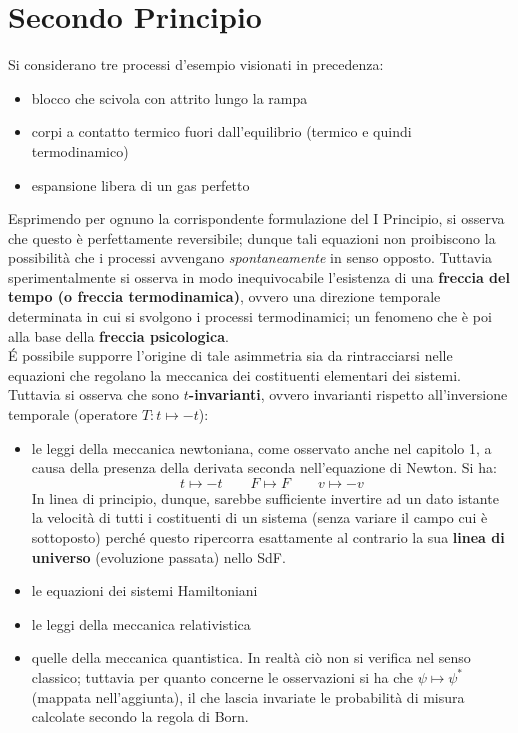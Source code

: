 \documentclass[10pt, oneside]{book}
\begin{document}
\chapter{Secondo Principio}
Si considerano tre processi d'esempio visionati in precedenza: 
\begin{itemize}
\item blocco che scivola con attrito lungo la rampa
\item corpi a contatto termico fuori dall'equilibrio (termico e quindi termodinamico)
\item espansione libera di un gas perfetto
\end{itemize}
Esprimendo per ognuno la corrispondente formulazione del I Principio, si osserva che questo è perfettamente reversibile; dunque tali equazioni non proibiscono la possibilità che i processi avvengano \textit{spontaneamente} in senso opposto. Tuttavia sperimentalmente si osserva in modo inequivocabile l'esistenza di una \textbf{freccia del tempo (o freccia termodinamica)}, ovvero una direzione temporale determinata in cui si svolgono i processi termodinamici; un fenomeno che è poi alla base della \textbf{freccia psicologica}.\\
\'E possibile supporre l'origine di tale asimmetria sia da rintracciarsi nelle equazioni che regolano la meccanica dei costituenti elementari dei sistemi. Tuttavia si osserva che sono \textbf{$t$-invarianti}, ovvero invarianti rispetto all'inversione temporale (operatore $T: t \mapsto -t$):
\begin{itemize}
\item le leggi della meccanica newtoniana, come osservato anche nel capitolo 1, a causa della presenza della derivata seconda nell'equazione di Newton. Si ha:
\[t \mapsto -t \quad \quad F \mapsto F \quad \quad v \mapsto -v\]
In linea di principio, dunque, sarebbe sufficiente invertire ad un dato istante la velocità di tutti i costituenti di un sistema (senza variare il campo cui è sottoposto) perché questo ripercorra esattamente al contrario la sua \textbf{linea di universo} (evoluzione passata) nello SdF.
\item le equazioni dei sistemi Hamiltoniani
\item le leggi della meccanica relativistica
\item quelle della meccanica quantistica. In realtà ciò non si verifica nel senso classico; tuttavia per quanto concerne le osservazioni si ha che $\psi \mapsto \psi^\ast$ (mappata nell'aggiunta), il che lascia invariate le probabilità di misura calcolate secondo la regola di Born.
\end{itemize}
\end{document}

